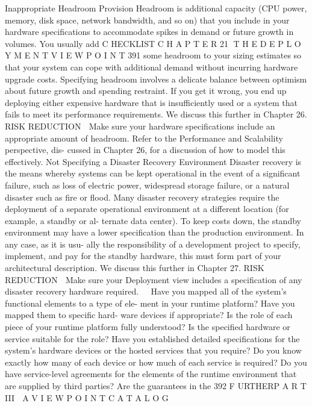 Inappropriate Headroom Provision
Headroom is additional capacity (CPU power, memory, disk space, network
bandwidth, and so on) that you include in your hardware specifications to
accommodate spikes in demand or future growth in volumes. You usually add
C HECKLIST
C H A P T E R 21  T H E D E P L O Y M E N T V I E W P O I N T
 391
some headroom to your sizing estimates so that your system can cope with
additional demand without incurring hardware upgrade costs.
Specifying headroom involves a delicate balance between optimism
about future growth and spending restraint. If you get it wrong, you end up
deploying either expensive hardware that is insufficiently used or a system
that fails to meet its performance requirements. We discuss this further in
Chapter 26.
RISK REDUCTION
 Make sure your hardware specifications include an appropriate amount
of headroom. Refer to the Performance and Scalability perspective, dis-
cussed in Chapter 26, for a discussion of how to model this effectively.
Not Specifying a Disaster Recovery Environment
Disaster recovery is the means whereby systems can be kept operational in
the event of a significant failure, such as loss of electric power, widespread
storage failure, or a natural disaster such as fire or flood.
Many disaster recovery strategies require the deployment of a separate
operational environment at a different location (for example, a standby or al-
ternate data center). To keep costs down, the standby environment may have a
lower specification than the production environment. In any case, as it is usu-
ally the responsibility of a development project to specify, implement, and pay
for the standby hardware, this must form part of your architectural description.
We discuss this further in Chapter 27.
RISK REDUCTION
 Make sure your Deployment view includes a specification of any disaster
recovery hardware required.
Have you mapped all of the system’s functional elements to a type of ele-
ment in your runtime platform? Have you mapped them to specific hard-
ware devices if appropriate?
Is the role of each piece of your runtime platform fully understood? Is the
specified hardware or service suitable for the role?
Have you established detailed specifications for the system’s hardware
devices or the hosted services that you require? Do you know exactly
how many of each device or how much of each service is required?
Do you have service-level agreements for the elements of the runtime
environment that are supplied by third parties? Are the guarantees in the
392
F URTHERP A R T III  A V I E W P O I N T C A T A L O G
